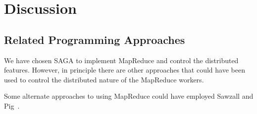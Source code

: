 \documentclass[conference,final]{IEEEtran}
\newcommand{\tc }{ $T_c$ }
\newcommand{\upp}{\vspace*{-0.5em}}
\begin{document}

\section{Discussion}

\subsection*{Related Programming Approaches}

We have chosen SAGA to implement MapReduce and control the distributed
features. However, in principle there are other approaches that could
have been used to control the distributed nature of the MapReduce
workers.

Some alternate approaches to using MapReduce could have employed
Sawzall and Pig~\cite{pig}.
\end{document}
